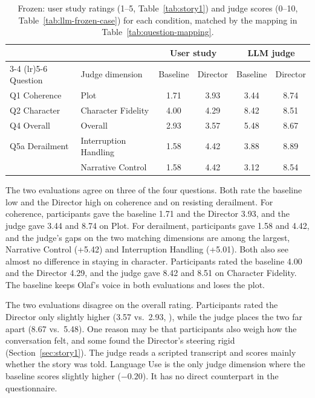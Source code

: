 \begin{table}[htbp]
\centering
\caption{Frozen: user study ratings (1--5, Table~\ref{tab:story1}) and judge scores (0--10, Table~\ref{tab:llm-frozen-case}) for each condition, matched by the mapping in Table~\ref{tab:question-mapping}.}
\label{tab:frozen-side}
\small
\begin{tabular}{llcccc}
\toprule
 & & \multicolumn{2}{c}{User study} & \multicolumn{2}{c}{LLM judge} \\
\cmidrule(lr){3-4} \cmidrule(lr){5-6}
Question & Judge dimension & Baseline & Director & Baseline & Director \\
\midrule
Q1 Coherence    & Plot                  & 1.71 & 3.93 & 3.44 & 8.74 \\
Q2 Character    & Character Fidelity    & 4.00 & 4.29 & 8.42 & 8.51 \\
Q4 Overall      & Overall               & 2.93 & 3.57 & 5.48 & 8.67 \\
Q5a Derailment  & Interruption Handling & 1.58 & 4.42 & 3.88 & 8.89 \\
                & Narrative Control     & 1.58 & 4.42 & 3.12 & 8.54 \\
\bottomrule
\end{tabular}
\end{table}

The two evaluations agree on three of the four questions. Both rate the baseline low and the Director high on coherence and on resisting derailment. For coherence, participants gave the baseline 1.71 and the Director 3.93, and the judge gave 3.44 and 8.74 on Plot. For derailment, participants gave 1.58 and 4.42, and the judge's gaps on the two matching dimensions are among the largest, Narrative Control (+5.42) and Interruption Handling (+5.01). Both also see almost no difference in staying in character. Participants rated the baseline 4.00 and the Director 4.29, and the judge gave 8.42 and 8.51 on Character Fidelity. The baseline keeps Olaf's voice in both evaluations and loses the plot.

The two evaluations disagree on the overall rating. Participants rated the Director only slightly higher (3.57 vs.\ 2.93, ), while the judge places the two far apart (8.67 vs.\ 5.48). One reason may be that participants also weigh how the conversation felt, and some found the Director's steering rigid (Section~\ref{sec:story1}). The judge reads a scripted transcript and scores mainly whether the story was told. Language Use is the only judge dimension where the baseline scores slightly higher ($-0.20$). It has no direct counterpart in the questionnaire.

